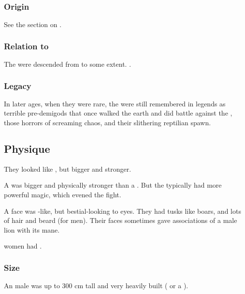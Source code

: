 \subsubsection{Origin}
See the section on . 





\subsubsection{Relation to \resphain}
The \resphain were descended from \aryothim to some extent. 
.





\subsubsection{Legacy}
In later ages, when they were rare, the \aryothim were still remembered in legends as terrible pre-\human demigods that once walked the earth and did battle against the \dragons, those horrors of screaming chaos, and their slithering reptilian spawn. 









\subsection{Physique}
They looked like \nephilim, but bigger and stronger. 

A \aryoth{} was bigger and physically stronger than a \quiljaar. 
But the \quiljaaran{} typically had more powerful magic, which evened the fight. 

A \aryoth{} face was \human-like, but bestial-looking to \human{} eyes. 
They had tusks like boars, and lots of hair and beard (for men). 
Their faces sometimes gave associations of a male lion with its mane. 

\Aryoth{} women had . 





\subsubsection{Size}
An \aryoth male was up to 300 cm tall and very heavily built ( or a \human). 











